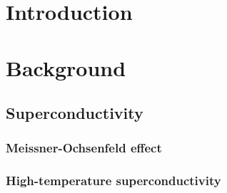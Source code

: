 \section{Introduction}
\label{sec:introduction}

\section{Background}
\label{sec:Background}

\subsection{Superconductivity}
\label{sec:Superconductivity}


\subsubsection{Meissner-Ochsenfeld effect}

\subsubsection{High-temperature superconductivity}
\label{sec:intr:high-tc}

